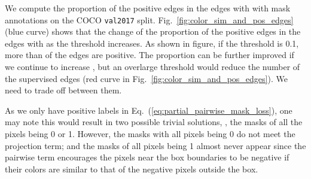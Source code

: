\documentclass[final]{cvpr}
\newcommand{\1}{{\mathbbm{1}}}
\begin{document}
{We compute the proportion of the positive edges in the edges with  with mask annotations on the COCO \texttt{val2017} split. Fig.~\ref{fig:color_sim_and_pos_edges} (blue curve) shows that the change of the proportion of the positive edges in the edges with  as the threshold  increases. As shown in figure, if the threshold is 0.1, more than  of the edges are positive. The proportion can be further improved if we continue to increase , but an overlarge threshold would reduce the number of the supervised edges (red curve in Fig.~\ref{fig:color_sim_and_pos_edges}). We need to trade off between them.

As we only have positive labels in Eq.~(\ref{eq:partial_pairwise_mask_loss}), one may note this would result in two possible trivial solutions, \ie, the masks of all the pixels being 0 or 1. However, the masks with all pixels being 0 do not meet the projection term; and the masks of all pixels being 1 almost never appear since the pairwise term encourages the pixels near the box boundaries to be negative if their colors are similar to that of the negative pixels outside the box.




}
\end{document}
